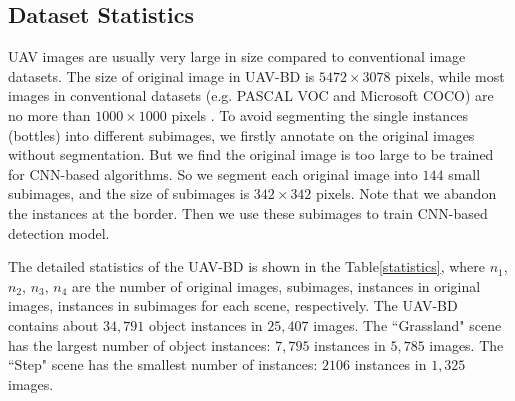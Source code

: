 



\subsection{Dataset Statistics}
\label{ssec:Dataset_Statistics}
UAV images are usually very large in size compared to conventional image datasets. The size of original image in UAV-BD is $ 5472\times 3078 $ pixels, while most images in conventional datasets (e.g. PASCAL VOC and Microsoft COCO) are no more than $ 1000\times 1000 $ pixels \cite{RCNNforSmall}. To avoid segmenting the single instances (bottles) into different subimages, we firstly annotate on the original images without segmentation. But we find the original image is too large to be trained for CNN-based algorithms. So we segment each original image into $ 144 $ small subimages, and the size of subimages is $ 342\times 342 $ pixels. Note that we abandon the instances at the border. Then we use these subimages to train CNN-based detection model. 


The detailed statistics of the UAV-BD is shown in the Table\ref{statistics}, where $ n_1 $, $ n_2 $, $ n_3 $,  $ n_4 $ are the number of original images, subimages, instances in original images, instances in subimages for each scene, respectively. The UAV-BD contains about $ 34,791 $ object instances in $ 25,407 $ images. The ``Grassland" scene has the largest number of object instances: $ 7,795 $ instances in $ 5,785 $ images. The ``Step" scene has the smallest number of instances: $ 2106 $ instances in $ 1,325 $ images.



